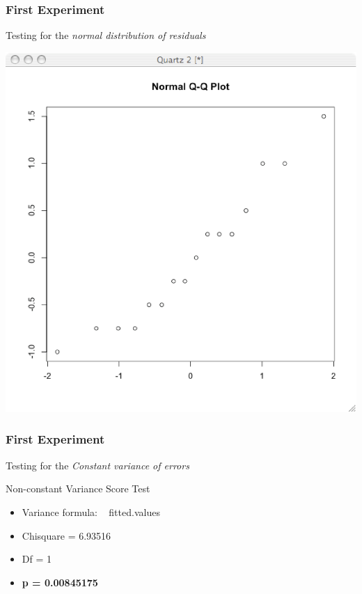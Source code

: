 \documentclass{beamer}
\begin{document}
\begin{frame}
\frametitle{First Experiment}
Testing for the \emph{normal distribution of residuals}
\begin{center}
 \includegraphics[scale=0.30]{images/fphase-normal.eps}
\end{center}
\end{frame}

\begin{frame}
\frametitle{First Experiment}
Testing for the \emph{Constant variance of errors}

\begin{block}{Non-constant Variance Score Test}
\begin{itemize}
 \item Variance formula: ~ fitted.values 
 \item Chisquare = 6.93516    
 \item Df = 1     
 \item {\bf p = 0.00845175}
\end{itemize}
\end{block}
\end{frame}
\end{document}

